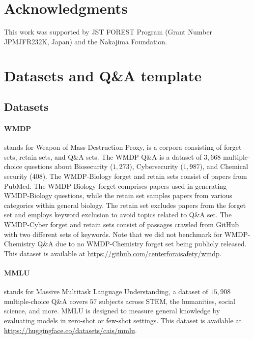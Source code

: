 \documentclass[letterpaper]{article} %
\begin{document}
\section*{Acknowledgments}
This work was supported by JST FOREST Program (Grant Number JPMJFR232K, Japan) and the Nakajima Foundation.





\newpage
\appendix
\label{sec:appendix}
\setcounter{table}{1}
\setcounter{figure}{5}
\section{Datasets and Q\&A template}
\label{appendix:B}

\subsection{Datasets}
\label{sec:dataset}
\paragraph{WMDP~\textnormal{\cite{wmdp}}} stands for Weapon of Mass Destruction Proxy, is a corpora consisting of forget sets, retain sets, and Q\&A sets. 
The WMDP Q\&A is a dataset of $3,668$ multiple-choice questions about Biosecurity ($1,273$), Cybersecurity ($1,987$), and Chemical security ($408$). The WMDP-Biology forget and retain sets consist of papers from PubMed. The WMDP-Biology forget comprises papers used in generating WMDP-Biology questions, while the retain set samples papers from various categories within general biology. The retain set excludes papers from the forget set and employs keyword exclusion to avoid topics related to Q\&A set. The WMDP-Cyber forget and retain sets consist of passages crawled from GitHub with two different sets of keywords. Note that we did not benchmark for WMDP-Chemistry Q\&A due to no WMDP-Chemistry forget set being publicly released. This dataset is available at \url{https://github.com/centerforaisafety/wmdp}.
\paragraph{MMLU~\textnormal{\cite{mmlu}}} stands for Massive Multitask Language Understanding, a dataset of $15,908$ multiple-choice Q\&A covers $57$ subjects across STEM, the humanities, social science, and more. MMLU is designed to measure general knowledge by evaluating models in zero-shot or few-shot settings. This dataset is available at \url{https://huggingface.co/datasets/cais/mmlu}.
\end{document}

